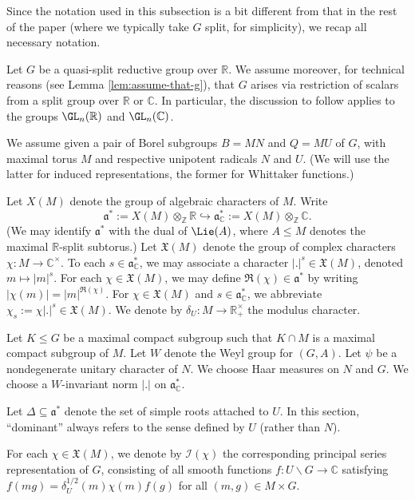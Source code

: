 Since the notation used in this subsection is a bit different from that in the rest of the paper (where we typically take $G$ split, for simplicity), we recap all necessary notation.

Let $G$ be a quasi-split reductive group over $\mathbb{R}$.  We assume moreover, for technical reasons (see Lemma \ref{lem:assume-that-g}), that $G$ arises via restriction of scalars from a split group over $\mathbb{R}$ or $\mathbb{C}$.  In particular, the discussion to follow applies to the groups $\GL_n(\mathbb{R})$ and $\GL_n(\mathbb{C})$.

We assume given a pair of Borel subgroups $B = M N$ and $Q = M U$ of $G$, with maximal torus $M$ and respective unipotent radicals $N$ and $U$.  (We will use the latter for induced representations, the former for Whittaker functions.)

Let $X(M)$ denote the group of algebraic characters of $M$.  Write
\begin{equation*}
  \mathfrak{a}^* := X(M) \otimes_{\mathbb{Z}} \mathbb{R} \hookrightarrow \mathfrak{a}_{\mathbb{C}}^* := X(M) \otimes_{\mathbb{Z}} \mathbb{C}.
\end{equation*}
(We may identify $\mathfrak{a}^*$ with the dual of $\Lie(A)$, where $A \leq M$ denotes the maximal $\mathbb{R}$-split subtorus.)  Let $\mathfrak{X}(M)$ denote the group of complex characters $\chi : M \rightarrow \mathbb{C}^\times$.  To each $s \in \mathfrak{a}_{\mathbb{C}}^*$, we may associate a character $|.|^s \in \mathfrak{X}(M)$, denoted $m \mapsto |m|^{s}$.  For each $\chi \in \mathfrak{X}(M)$, we may define $\Re(\chi) \in \mathfrak{a}^*$ by writing $|\chi(m)| = |m|^{\Re(\chi)}$.  For $\chi \in \mathfrak{X}(M)$ and $s \in \mathfrak{a}^*_{\mathbb{C}}$, we abbreviate $\chi_s := \chi |.|^s \in \mathfrak{X}(M)$.  We denote by $\delta_U : M \rightarrow \mathbb{R}^\times_+$ the modulus character.

Let $K \leq G$ be a maximal compact subgroup such that $K \cap M$ is a maximal compact subgroup of $M$.  Let $W$ denote the Weyl group for $(G,A)$.  Let $\psi$ be a nondegenerate unitary character of $N$.  We choose Haar measures on $N$ and $G$.  We choose a $W$-invariant norm $|.|$ on $\mathfrak{a}_{\mathbb{C}}^*$.

Let $\Delta \subseteq \mathfrak{a}^*$ denote the set of simple roots attached to $U$.  In this section, ``dominant'' always refers to the sense defined by $U$ (rather than $N$).

For each $\chi \in \mathfrak{X}(M)$, we denote by $\mathcal{I}(\chi)$ the corresponding principal series representation of $G$, consisting of all smooth functions $f : U \backslash G \rightarrow \mathbb{C}$ satisfying $f(m g) = \delta_U^{1/2}(m) \chi(m) f(g)$ for all $(m,g) \in M \times G$.

